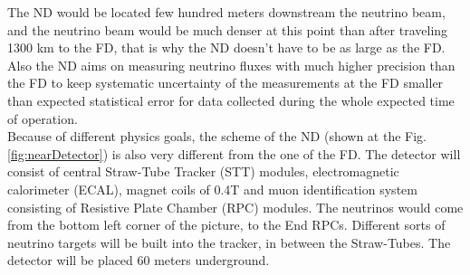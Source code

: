 The ND would be located few hundred meters downstream the neutrino beam, and the neutrino beam would be much denser at this point than after traveling 1300 km to the FD, that is why the ND doesn't have to be as large as the FD. Also the ND aims on measuring neutrino fluxes with much higher precision than the FD to keep systematic uncertainty of the measurements at the FD smaller than expected statistical error for data collected during the whole expected time of operation.\\  

Because of different physics goals, the scheme of the ND (shown at the Fig. \ref{fig:nearDetector}) is also very different from the one of the FD. The detector will consist of central Straw-Tube Tracker (STT) modules, electromagnetic calorimeter (ECAL), magnet coils of 0.4T and muon identification system consisting of Resistive Plate Chamber (RPC) modules. The neutrinos would come from the bottom left corner of the picture, to the End RPCs. Different sorts of neutrino targets will be built into the tracker, in between the Straw-Tubes. The detector will be placed 60 meters underground.




